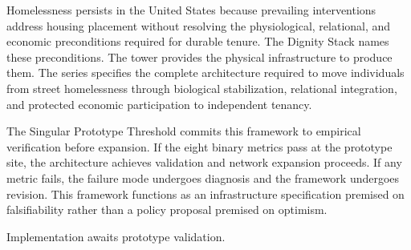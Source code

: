 \documentclass[12pt, letterpaper]{article}
\begin{document}
Homelessness persists in the United States because prevailing interventions address housing placement without resolving the physiological, relational, and economic preconditions required for durable tenure. The Dignity Stack names these preconditions. The tower provides the physical infrastructure to produce them. The series specifies the complete architecture required to move individuals from street homelessness through biological stabilization, relational integration, and protected economic participation to independent tenancy.

The Singular Prototype Threshold commits this framework to empirical verification before expansion. If the eight binary metrics pass at the prototype site, the architecture achieves validation and network expansion proceeds. If any metric fails, the failure mode undergoes diagnosis and the framework undergoes revision. This framework functions as an infrastructure specification premised on falsifiability rather than a policy proposal premised on optimism.

Implementation awaits prototype validation.

\newpage
{}


\end{document}
